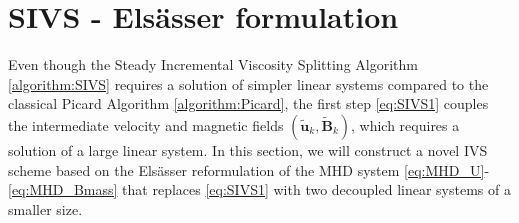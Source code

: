 \documentclass[3p]{elsarticle}
\def\Vt#1{\mathbf{\tilde{#1}}}
\begin{document}
\section{SIVS - Els{\"a}sser formulation}\label{sec:SIVS_Els}
Even though the Steady Incremental Viscosity Splitting Algorithm \ref{algorithm:SIVS} requires a solution of simpler linear systems compared to the classical Picard Algorithm \ref{algorithm:Picard}, the first step \eqref{eq:SIVS1} couples the intermediate velocity and magnetic fields $(\Vt{u}_{k},\Vt{B}_{k})$, which requires a solution of a large linear system. In this section, we will construct a novel IVS scheme based on the Els{\"a}sser reformulation of the MHD system \eqref{eq:MHD_U}-\eqref{eq:MHD_Bmass} that replaces \eqref{eq:SIVS1} with two decoupled linear systems of a smaller size.
\end{document}
